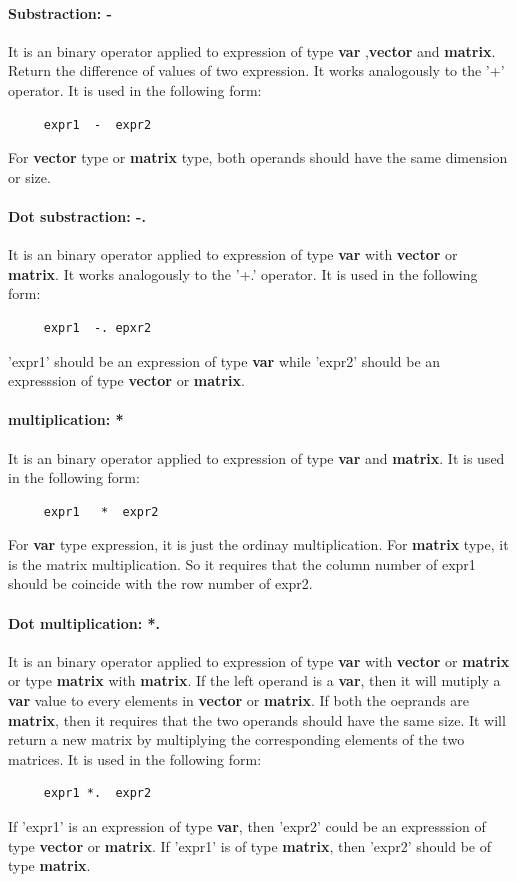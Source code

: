\documentclass[12pt]{article} %
\begin{document}
\paragraph{Substraction: - }
It is an binary operator applied to expression of type \textbf{var} ,\textbf{vector} and  \textbf{matrix}. Return the difference of values of two expression. It works analogously to the '+' operator. It is used in the following form:
\begin{lstlisting}
     expr1  -  expr2
\end{lstlisting}
 For \textbf{vector}  type or \textbf{matrix} type,  both operands should have the same dimension or size.
  
\paragraph{Dot substraction: -. }
It is an binary operator applied to expression of type  \textbf{var} with \textbf{vector} or \textbf{matrix}.  It works analogously to the '+.' operator. It is used in the following form: 
\begin{lstlisting}
     expr1  -. epxr2
\end{lstlisting}
'expr1' should be an expression of type  \textbf{var} while 'expr2' should be an expresssion of type  \textbf{vector} or  \textbf{matrix}.

\paragraph{multiplication: *}
It is an binary operator applied to expression of type \textbf{var}  and  \textbf{matrix}.  It is used in the following form:
\begin{lstlisting}
     expr1   *  expr2
\end{lstlisting}
For \textbf{var} type expression, it  is just the ordinay multiplication. For \textbf{matrix}  type,  it is the matrix multiplication. So it requires that the column number of expr1 should be coincide with the row number of expr2.
 
\paragraph{Dot multiplication: *.}
It is an binary operator applied to expression of type  \textbf{var} with \textbf{vector} or \textbf{matrix} or type \textbf{matrix} with \textbf{matrix}. If the left operand is a  \textbf{var}, then  it will  mutiply a \textbf{var} value to every elements in \textbf{vector}  or  \textbf{matrix}. If both the oeprands are  \textbf{matrix}, then it  requires that the two operands should have the same size. It will return a new matrix  by multiplying the corresponding elements of the two matrices. It is used in the following form: 
\begin{lstlisting}
     expr1 *.  expr2
\end{lstlisting}
If 'expr1' is an expression of type  \textbf{var}, then 'expr2' could be an expresssion of type  \textbf{vector} or  \textbf{matrix}. If 'expr1' is of type  \textbf{matrix}, then 'expr2' should be of type  \textbf{matrix}.
\end{document}
